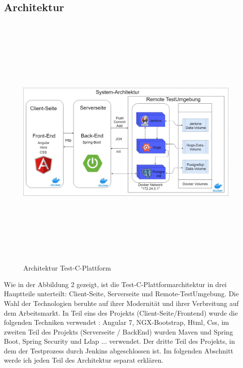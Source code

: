 \documentclass[apaper4,12p]{scrartcl}
\begin{document}
\subsection{Architektur}
\begin{figure}[h!]
	\begin{center}
		\includegraphics[width=17.5cm, height=13cm]{Test-C-Plattform-Arch.jpg}
		\caption{Architektur Test-C-Plattform } 
		\label{ Architektur Test-C-Plattform } 
	\end{center}
\end{figure}
Wie in der Abbildung 2 gezeigt, ist die Test-C-Plattformarchitektur in drei Hauptteile unterteilt: Client-Seite, Serverseite und Remote-TestUmgebung.
\newline
Die Wahl der Technologien beruhte auf ihrer Modernität und ihrer Verbreitung auf dem Arbeitsmarkt. In Teil eins des Projekts (Client-Seite/Frontend) wurde die folgenden Techniken verwendet : Angular 7, NGX-Bootstrap, Html, Css, im zweiten Teil des Projekts (Serverseite / BackEnd) wurden Maven und Spring Boot, Spring Security und Ldap ... verwendet. Der dritte Teil des Projekts, in dem der Testprozess durch Jenkins abgeschlossen ist.
\newline
Im folgenden Abschnitt werde ich jeden Teil des Architektur separat erklären.
\end{document}
